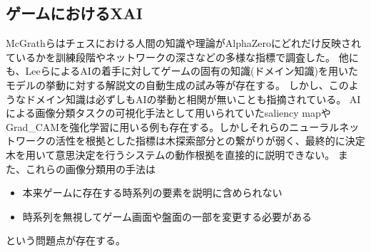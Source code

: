 \subsection{ゲームにおけるXAI}
McGrathら\cite{DeepMind}はチェスにおける人間の知識や理論がAlphaZeroにどれだけ反映されているかを訓練段階やネットワークの深さなどの多様な指標で調査した。
他にも、Leeら\cite{DecodeChess}によるAIの着手に対してゲームの固有の知識(ドメイン知識)を用いたモデルの挙動に対する解説文の自動生成の試み等が存在する。
しかし、このようなドメイン知識は必ずしもAIの挙動と相関が無いことも指摘されている\cite{DeepMind}。
AIによる画像分類タスクの可視化手法として用いられていたsaliency map\cite{saliency}やGrad\_CAM\cite{Grad-CAM}を強化学習に用いる例も存在する\cite{gl}\cite{atari-saliency}\cite{visualize}。しかしそれらのニューラルネットワークの活性を根拠とした指標は木探索部分との繋がりが弱く、最終的に決定木を用いて意思決定を行うシステムの動作根拠を直接的に説明できない。
また、これらの画像分類用の手法は
\begin{itemize}
	\item 本来ゲームに存在する時系列の要素を説明に含められない
	\item 時系列を無視してゲーム画面や盤面の一部を変更する必要がある
\end{itemize}
という問題点が存在する。

